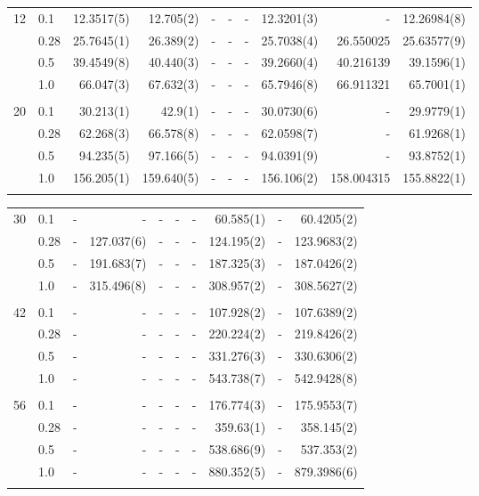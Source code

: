 \begin{landscape}
\begin{table} [H]
\begin{tabularx}{\hsize}{l:l|RRRRRRRR}
		12 & 0.1 & 12.3517(5) & 12.705(2) & - & - & - & 12.3201(3) & - & 12.26984(8) \\ 
		& 0.28 & 25.7645(1) & 26.389(2) & - & - & - & 25.7038(4) & 26.550025 & 25.63577(9) \\
		& 0.5 & 39.4549(8) & 40.440(3) & - & - & - & 39.2660(4) & 40.216139 & 39.1596(1) \\
		& 1.0 & 66.047(3) & 67.632(3) & - & - & - & 65.7946(8) & 66.911321 & 65.7001(1) \\ \hdashline \\
		
		20 & 0.1 & 30.213(1) & 42.9(1) & - & - & - & 30.0730(6) & - & 29.9779(1) \\ 
		& 0.28 & 62.268(3) & 66.578(8) & - & - & - & 62.0598(7) & - & 61.9268(1) \\
		& 0.5 & 94.235(5) & 97.166(5) & - & - & - & 94.0391(9) & - & 93.8752(1) \\
		& 1.0 & 156.205(1) & 159.640(5) & - & - & - & 156.106(2) & 158.004315 & 155.8822(1) \\ \hdashline
	\end{tabularx}
\end{table}

\begin{table} [H]
	\begin{tabularx}{\hsize}{l:l|RRRRRRRR} \\
		\label{tab:quantumdotswinteraction2D2}
		30 & 0.1 & - & - & - & - & - & 60.585(1) & - & 60.4205(2) \\ 
		& 0.28 & - & 127.037(6) & - & - & - & 124.195(2) & - & 123.9683(2) \\
		& 0.5 & - & 191.683(7) & - & - & - & 187.325(3) & - & 187.0426(2) \\
		& 1.0 & - & 315.496(8) & - & - & - & 308.957(2) & - & 308.5627(2) \\ \hdashline \\
		
		42 & 0.1 & - & - & - & - & - & 107.928(2) & - & 107.6389(2) \\ 
		& 0.28 & - & - & - & - & - & 220.224(2) & - & 219.8426(2) \\
		& 0.5 & - & - & - & - & - & 331.276(3) & - & 330.6306(2) \\
		& 1.0 & - & - & - & - & - & 543.738(7) & - & 542.9428(8) \\ \hdashline \\
		
		56 & 0.1 & - & - & - & - & - & 176.774(3) & - & 175.9553(7) \\ 
		& 0.28 & - & - & - & - & - & 359.63(1) & - & 358.145(2) \\
		& 0.5 & - & - & - & - & - & 538.686(9) & - & 537.353(2) \\
		& 1.0 & - & - & - & - & - & 880.352(5) & - & 879.3986(6) \\ \hdashline \\
		

\end{tabularx}
\end{table}
\end{landscape}

